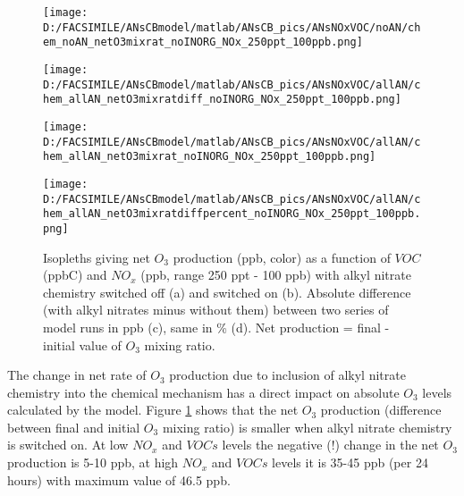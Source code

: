 \documentclass[11pt,a4paper]{article}
\begin{document}
\begin{figure} %
\centering
\begin{minipage}{.4\textwidth} %
  \centering
  \texttt{[image: D:/FACSIMILE/ANsCBmodel/matlab/ANsCB\_pics/ANsNOxVOC/noAN/chem\_noAN\_netO3mixrat\_noINORG\_NOx\_250ppt\_100ppb.png]}
\end{minipage}
\begin{minipage}{.4\textwidth} %
  \centering
  \texttt{[image: D:/FACSIMILE/ANsCBmodel/matlab/ANsCB\_pics/ANsNOxVOC/allAN/chem\_allAN\_netO3mixratdiff\_noINORG\_NOx\_250ppt\_100ppb.png]}
\end{minipage}
\begin{minipage}{.4\textwidth} %
  \centering
  \texttt{[image: D:/FACSIMILE/ANsCBmodel/matlab/ANsCB\_pics/ANsNOxVOC/allAN/chem\_allAN\_netO3mixrat\_noINORG\_NOx\_250ppt\_100ppb.png]}
\end{minipage}
\begin{minipage}{.4\textwidth} %
  \centering
  \texttt{[image: D:/FACSIMILE/ANsCBmodel/matlab/ANsCB\_pics/ANsNOxVOC/allAN/chem\_allAN\_netO3mixratdiffpercent\_noINORG\_NOx\_250ppt\_100ppb.png]}
\end{minipage}
\caption{Isopleths giving net $O_3$ production (ppb, color) as a function of $VOC$ (ppbC) and $NO_x$ (ppb, range 250 ppt - 100 ppb) with alkyl nitrate chemistry switched off (a) and switched on (b). Absolute difference (with alkyl nitrates minus without them) between two series of model runs in ppb (c), same in \% (d). Net production = final - initial value of $O_3$ mixing ratio.}\label{fig:netO3mixrat_noAN_withAN_diff}
\end{figure}

The change in net rate of $O_3$ production due to inclusion of alkyl nitrate chemistry into the chemical mechanism has a direct impact on absolute $O_3$ levels calculated by the model. Figure \ref{fig:netO3mixrat_noAN_withAN_diff} shows that the net $O_3$ production (difference between final and initial $O_3$ mixing ratio) is smaller when alkyl nitrate chemistry is switched on. At low $NO_x$ and $VOCs$ levels the negative (!) change in the net $O_3$ production is 5-10 ppb, at high $NO_x$ and $VOCs$ levels it is 35-45 ppb (per 24 hours) with maximum value of 46.5 ppb.
\end{document}
